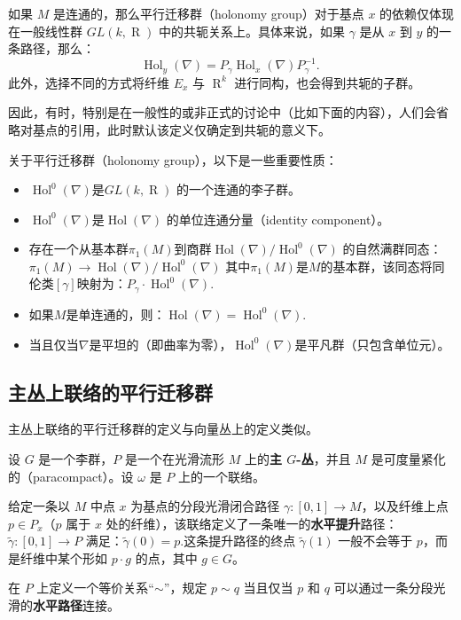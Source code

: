 如果 \(M\) 是连通的，那么平行迁移群（holonomy group）对于基点 \(x\) 的依赖仅体现在一般线性群 \(GL(k, \operatorname{R})\) 中的共轭关系上。具体来说，如果 \(\gamma\) 是从 \(x\) 到 \(y\) 的一条路径，那么：
\[
\operatorname{Hol}_y(\nabla) = P_\gamma \operatorname{Hol}_x(\nabla) P_\gamma^{-1}.~
\]
此外，选择不同的方式将纤维 \(E_x\) 与 \(\operatorname{R}^k\) 进行同构，也会得到共轭的子群。  

因此，有时，特别是在一般性的或非正式的讨论中（比如下面的内容），人们会省略对基点的引用，此时默认该定义仅确定到共轭的意义下。

关于平行迁移群（holonomy group），以下是一些重要性质：
\begin{itemize}
\item \(\operatorname{Hol}^0(\nabla)\)是\(GL(k,\operatorname{R})\) 的一个连通的李子群。
\item \(\operatorname{Hol}^0(\nabla)\)是\(\operatorname{Hol}(\nabla)\) 的单位连通分量（identity component）。
\item 存在一个从基本群\(\pi_1(M)\)到商群\(\operatorname{Hol}(\nabla)/\operatorname{Hol}^0(\nabla)\) 的自然满群同态：\(\pi_1(M) \to \operatorname{Hol}(\nabla)/\operatorname{Hol}^0(\nabla)\)
其中\(\pi_1(M)\)是\(M\)的基本群，该同态将同伦类\([\gamma]\)映射为：\(P_\gamma \cdot \operatorname{Hol}^0(\nabla)\).
\item 如果\(M\)是单连通的，则：\(\operatorname{Hol}(\nabla) = \operatorname{Hol}^0(\nabla)\).
\item 当且仅当\(\nabla\)是平坦的（即曲率为零），\(\operatorname{Hol}^0(\nabla)\)是平凡群（只包含单位元）。
\end{itemize}
\subsection{主丛上联络的平行迁移群}  
主丛上联络的平行迁移群的定义与向量丛上的定义类似。  

设 \(G\) 是一个李群，\(P\) 是一个在光滑流形 \(M\) 上的\textbf{主 \(G\)-丛}，并且 \(M\) 是可度量紧化的（paracompact）。设 \(\omega\) 是 \(P\) 上的一个联络。  

给定一条以 \(M\) 中点 \(x\) 为基点的分段光滑闭合路径 \(\gamma : [0,1] \to M\)，以及纤维上点 \(p \in P_x\)（\(p\) 属于 \(x\) 处的纤维），该联络定义了一条唯一的\textbf{水平提升}路径：\(\tilde{\gamma} : [0,1] \to P\)
满足：\(\tilde{\gamma}(0) = p\).这条提升路径的终点 \(\tilde{\gamma}(1)\) 一般不会等于 \(p\)，而是纤维中某个形如 \(p \cdot g\) 的点，其中 \(g \in G\)。

在 \(P\) 上定义一个等价关系“\(\sim\)”，规定 \(p \sim q\) 当且仅当 \(p\) 和 \(q\) 可以通过一条分段光滑的\textbf{水平路径}连接。

